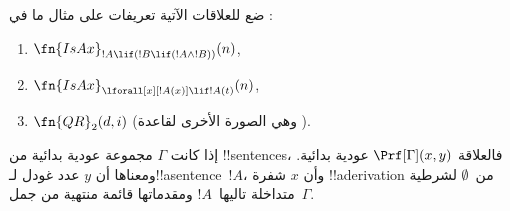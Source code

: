 \documentclass[../../../include/open-logic-section]{subfiles}
\begin{document}
\begin{prob}
ضع للعلاقات الآتية تعريفات على مثال ما في
:
\begin{enumerate}
\item $\fn{IsAx}_{!A \lif (!B \lif (!A \land !B))}(n)$,
\item $\fn{IsAx}_{\lforall[x][!A(x)] \lif !A(t)}(n)$,
\item $\fn{QR}_{2}(d, i)$ (وهي الصورة الأخرى لقاعدة \QR).
\end{enumerate}
\end{prob}

\begin{prop}
إذا كانت $\Gamma$ مجموعة عودية بدائية من !!{sentence}s، فالعلاقة
$\Prf[\Gamma](x,y)$ عودية بدائية. ومعناها أن $y$ عدد غودل
لـ!!a{sentence}~$!A$، وأن $x$ شفرة !!a{derivation} من~$\emptyset$
لشرطية متداخلة تاليها~$!A$ ومقدماتها قائمة منتهية من جمل~$\Gamma$.
\end{prop}
\end{document}

